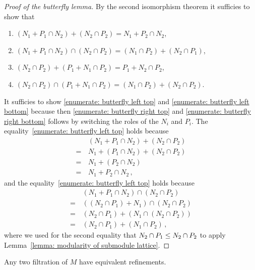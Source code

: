 \begin{proof}[Proof of the butterfly lemma]
  By the second isomorphism theorem it sufficies to show that 
  \begin{enumerate}
    \item
      \label{enumerate: butterfly left top}
      $(N_1 + P_1 \cap N_2) + (N_2 \cap P_2) = N_1 + P_2 \cap N_2$,
    \item
      \label{enumerate: butterfly left bottom}
      $(N_1 + P_1 \cap N_2) \cap (N_2 \cap P_2) = (N_1 \cap P_2) + (N_2 \cap P_1)$,
    \item
      \label{enumerate: butterfly right top}
      $(N_2 \cap P_2) + (P_1 + N_1 \cap P_2) = P_1 + N_2 \cap P_2$,
    \item
      \label{enumerate: butterfly right bottom}
      $(N_2 \cap P_2) \cap (P_1 + N_1 \cap P_2) = (N_1 \cap P_2) + (N_2 \cap P_2)$.
  \end{enumerate}
  It sufficies to show \ref*{enumerate: butterfly left top} and \ref*{enumerate: butterfly left bottom} because then \ref*{enumerate: butterfly right top} and \ref*{enumerate: butterfly right bottom} follows by switching the roles of the $N_i$ and $P_i$.
  The equality~\ref*{enumerate: butterfly left top} holds because
  \begin{align*}
     &\,  (N_1 + P_1 \cap N_2) + (N_2 \cap P_2) \\
    =&\,  N_1 + (P_1 \cap N_2) + (N_2 \cap P_2) \\
    =&\,  N_1 + (P_2 \cap N_2)                  \\
    =&\,  N_1 + P_2 \cap N_2 \,,
  \end{align*}
  and the equality~\ref*{enumerate: butterfly left top} holds because
  \begin{align*}
     &\,  (N_1 + P_1 \cap N_2) \cap (N_2 \cap P_2)    \\
    =&\,  ((N_2 \cap P_1) + N_1) \cap (N_2 \cap P_2)  \\
    =&\,  (N_2 \cap P_1) + (N_1 \cap (N_2 \cap P_2))  \\
    =&\,  (N_2 \cap P_1) + (N_1 \cap P_2) \,,
  \end{align*}
  where we used for the second equality that $N_2 \cap P_1 \leq N_2 \cap P_2$ to apply Lemma~\ref{lemma: modularity of submodule lattice}.
\end{proof}


\begin{theorem}[Schreier]
  \label{theorem: Schreiers theorem}
  Any two filtration of $M$ have equivalent refinements.
\end{theorem}


